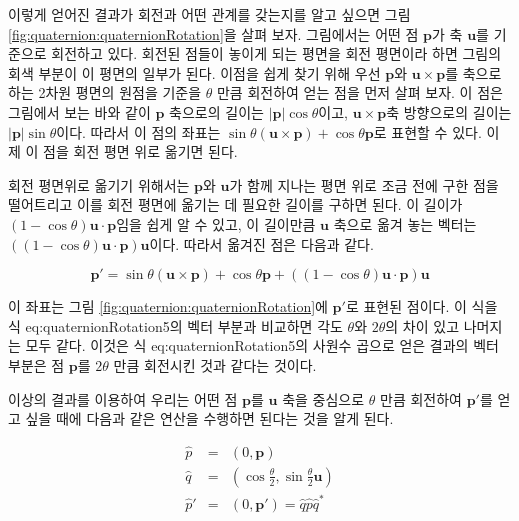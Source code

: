 이렇게 얻어진 결과가 회전과 어떤 관계를 갖는지를 알고 싶으면 그림 \ref{fig:quaternion:quaternionRotation}을 살펴 보자.
그림에서는 어떤 점 $\mathbf p$가 축 $\mathbf u$를 기준으로 회전하고 있다. 회전된 점들이 놓이게 되는 평면을 회전 평면이라 하면
그림의 회색 부분이 이 평면의 일부가 된다.
이점을 쉽게 찾기 위해 우선 $\mathbf p$와 $\mathbf u \times \mathbf p$를 축으로 하는 2차원 평면의 원점을 기준을 $\theta$ 만큼 회전하여 얻는 점을
먼저 살펴 보자. 이 점은 그림에서 보는 바와 같이 $\mathbf p$ 축으로의 길이는 $|\mathbf p| \cos \theta$이고,
$\mathbf u \times \mathbf p$축 방향으로의 길이는 $|\mathbf p| \sin \theta $이다.
따라서 이 점의 좌표는 $\sin \theta (\mathbf u \times \mathbf p) + \cos \theta \mathbf p$로 표현할 수 있다.
이제 이 점을 회전 평면 위로 옮기면 된다.

회전 평면위로 옮기기 위해서는 $\mathbf p$와 $\mathbf u$가 함께 지나는 평면 위로 조금 전에 구한 점을 떨어트리고 이를 회전 평면에 옮기는 데 필요한 길이를
구하면 된다. 이 길이가 $(1 - \cos \theta) \mathbf u \cdot \mathbf p$임을 쉽게 알 수 있고, 이 길이만큼 $\mathbf u$ 축으로 옮겨 놓는 벡터는
$((1-\cos \theta ) \mathbf u \cdot \mathbf p ) \mathbf u$이다.
따라서 옮겨진 점은 다음과 같다.

$$\mathbf p' = \sin \theta (\mathbf u \times \mathbf p) + \cos \theta \mathbf p +((1-\cos \theta ) \mathbf u \cdot \mathbf p ) \mathbf u$$

이 좌표는 그림 \ref{fig:quaternion:quaternionRotation}에 $\mathbf p'$로 표현된 점이다.
이 식을 식 {eq:quaternionRotation5}의 벡터 부분과 비교하면 각도 $\theta$와 $2 \theta$의 차이 있고 나머지는 모두 같다.
이것은 식 {eq:quaternionRotation5}의 사원수 곱으로 얻은 결과의 벡터 부분은 점 $\mathbf p$를 $2 \theta$ 만큼 회전시킨 것과 같다는 것이다.

이상의 결과를 이용하여 우리는 어떤 점 $\mathbf p$를 $\mathbf u$ 축을 중심으로 $\theta$ 만큼 회전하여 $\mathbf p'$를 얻고 싶을 때에 다음과 같은
연산을 수행하면 된다는 것을 알게 된다.

\begin{eqnarray}
\hat p &=& (0, \mathbf p) \\ \nonumber
\hat q &=& (\cos \frac{\theta}{2}, \sin \frac{\theta}{2} \mathbf u) \\ \nonumber
\hat p' &=& (0, \mathbf p') = \hat q \hat p \hat q^*
\end{eqnarray}

